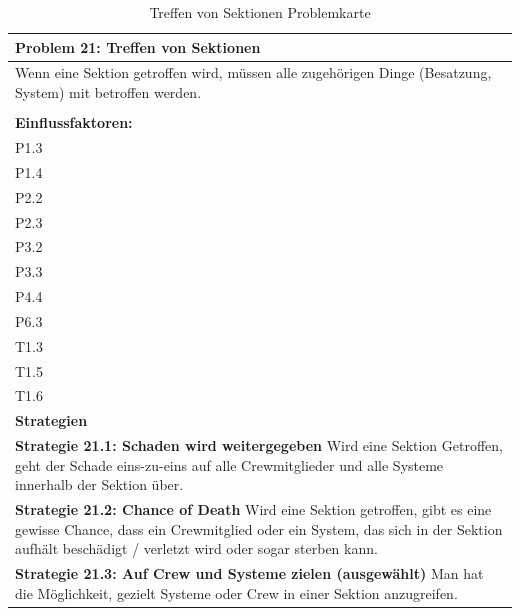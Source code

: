 \documentclass[fontsize=12pt,paper=a4,twoside]{scrartcl}
\begin{document}
\begin{table}[H]
    \centering
    \begin{tabular}{|p{15cm}|}
    \hline
          \textbf{Problem 21: Treffen von Sektionen}  \\ \hline
	Wenn eine Sektion getroffen wird, müssen alle zugehörigen Dinge (Besatzung, System) mit betroffen werden. \\
         \\ \hline
          \textbf{Einflussfaktoren: } \\
	P1.3\\
	P1.4 \\
	P2.2 \\
	P2.3 \\
	P3.2 \\
	P3.3 \\
	P4.4 \\
	P6.3 \\
	T1.3 \\
	T1.5 \\
	T1.6 \\
          \hline
          \textbf{Strategien} \\ \hline
            {}          
           \label{strategie:21.1}     
          \textbf{Strategie 21.1: Schaden wird weitergegeben} Wird eine Sektion Getroffen, geht der Schade eins-zu-eins auf alle Crewmitglieder und alle Systeme innerhalb der Sektion über.  \\        
  {}          
           \label{strategie:21.2}              
          \textbf{Strategie 21.2: Chance of Death} Wird eine Sektion getroffen, gibt es eine gewisse Chance, dass ein Crewmitglied oder ein System, das sich in der Sektion aufhält beschädigt / verletzt wird oder sogar sterben kann.  \\
	 
	 {}
	 \label{strategie:21.3}
	 \textbf{Strategie 21.3: Auf Crew und Systeme zielen (ausgewählt)} Man hat die Möglichkeit, gezielt Systeme oder Crew in einer Sektion anzugreifen.
	 \\ \hline
    \end{tabular}

    \caption{Treffen von Sektionen Problemkarte}
    \label{tab:ProblemKarte21}
\end{table}
\end{document}
